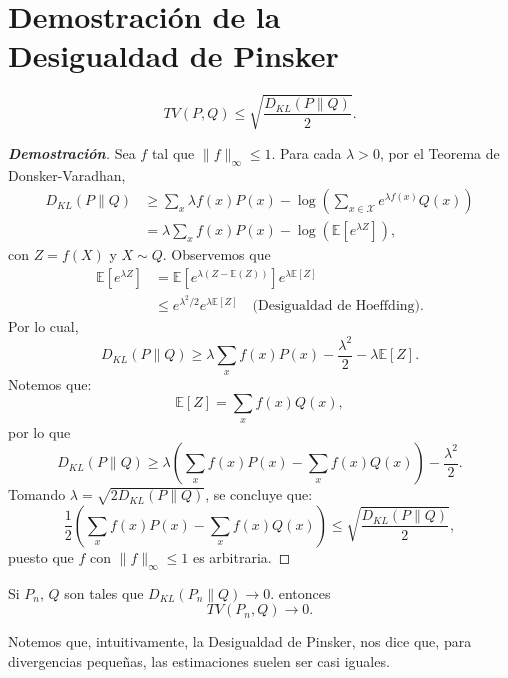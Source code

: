 \section{Demostraci\'on de la\\
Desigualdad de Pinsker}
\begin{theorem}
    \begin{equation*}
        TV(P,Q)\leq\sqrt{\frac{D_{KL}(P\|Q)}{2}}.
    \end{equation*}
\end{theorem}
\begin{proof}[\textbf{Demostraci\'on}]
Sea $f$ tal que $\|f\|_\infty\leq1$. Para cada $\lambda>0$, por el Teorema de Donsker-Varadhan, 
\begin{align*}
    D_{KL}(P\|Q)&\geq\sum_{x}\lambda f(x)P(x)-\log\left(\sum_{x\in\mathcal{X}}e^{\lambda f(x)}Q(x)\right)\\
    &=\lambda\sum_{x}f(x)P(x)-\log\left(\mathbb{E}[e^{\lambda Z}]\right),
\end{align*}
con $Z=f(X)$ y $X\sim Q$. Observemos que
\begin{align*}
    \mathbb{E}[e^{\lambda Z}]&=\mathbb{E}[e^{\lambda(Z-\mathbb{E}(Z))}]e^{\lambda\mathbb{E}[Z]}\\
    &\leq e^{\lambda^2/2}e^{\lambda\mathbb{E}[Z]}\quad\text{(Desigualdad de Hoeffding)}.
\end{align*}
Por lo cual,
\begin{equation*}
   D_{KL}(P\|Q)\geq\lambda\sum_{x}f(x)P(x)-\frac{\lambda^2}{2}-\lambda\mathbb{E}[Z]. 
\end{equation*}
Notemos que:
\begin{equation*}
    \mathbb{E}[Z]=\sum_{x}f(x)Q(x),
\end{equation*}
por lo que
\begin{equation*}
    D_{KL}(P\|Q)\geq\lambda\left(\sum_xf(x)P(x)-\sum_xf(x)Q(x)\right)-\frac{\lambda^2}{2}.
\end{equation*}
Tomando $\lambda=\sqrt{2 D_{KL}(P\|Q)}$, se concluye que:
\begin{equation*}
    \frac{1}{2}\left(\sum_xf(x)P(x)-\sum_xf(x)Q(x)\right)\leq\sqrt{\frac{D_{KL}(P\|Q)}{2}},
\end{equation*}
puesto que $f$ con $\|f\|_\infty\leq1$ es arbitraria. 
\end{proof}

\begin{corollary}
Si $P_n$, $Q$ son tales que $D_{KL}(P_n\|Q)\to0$. entonces
\begin{equation*}
    TV(P_n,Q)\to0.
\end{equation*}
\end{corollary}

\begin{observation}
Notemos que, intuitivamente, la Desigualdad de Pinsker, nos dice que, para divergencias pequeñas, las estimaciones suelen ser casi iguales.      
\end{observation}